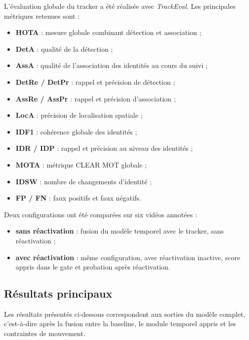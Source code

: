 \documentclass[11pt,a4paper]{article}
\begin{document}
L'évaluation globale du tracker a été réalisée avec \textit{TrackEval}. Les principales métriques retenues sont :
\begin{itemize}
    \item \textbf{HOTA} : mesure globale combinant détection et association ;
    \item \textbf{DetA} : qualité de la détection ;
    \item \textbf{AssA} : qualité de l'association des identités au cours du suivi ;
    \item \textbf{DetRe / DetPr} : rappel et précision de détection ;
    \item \textbf{AssRe / AssPr} : rappel et précision d'association ;
    \item \textbf{LocA} : précision de localisation spatiale ;
    \item \textbf{IDF1} : cohérence globale des identités ;
    \item \textbf{IDR / IDP} : rappel et précision au niveau des identités ;
    \item \textbf{MOTA} : métrique CLEAR MOT globale ;
    \item \textbf{IDSW} : nombre de changements d'identité ;
    \item \textbf{FP / FN} : faux positifs et faux négatifs.
\end{itemize}

Deux configurations ont été comparées sur six vidéos annotées :
\begin{itemize}
    \item \textbf{sans réactivation} : fusion du modèle temporel avec le tracker, sans réactivation ;
    \item \textbf{avec réactivation} : même configuration, avec réactivation inactive, score appris dans le gate et probation après réactivation.
\end{itemize}

\subsection{Résultats principaux}

Les résultats présentés ci-dessous correspondent aux sorties du modèle complet, c'est-à-dire après la fusion entre la baseline, le module temporel appris et les contraintes de mouvement.
\end{document}
